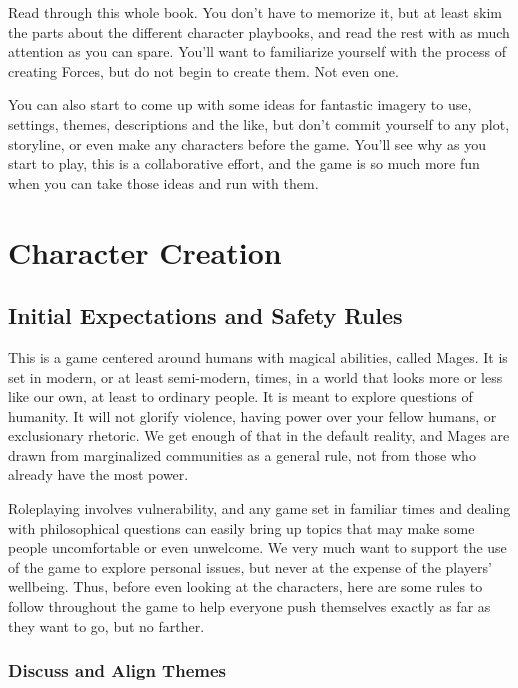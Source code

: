 \documentclass[
  oneside,
  statementpaper,
  9pt]{memoir}
\begin{document}
Read through this whole book. You don't have to memorize it, but at
least skim the parts about the different character playbooks, and read
the rest with as much attention as you can spare. You'll want to
familiarize yourself with the process of creating Forces, but do not
begin to create them. Not even one.

You can also start to come up with some ideas for fantastic imagery to
use, settings, themes, descriptions and the like, but don't commit
yourself to any plot, storyline, or even make any characters before the
game. You'll see why as you start to play, this is a collaborative
effort, and the game is so much more fun when you can take those ideas
and run with them.

\hypertarget{character-creation}{%
\section{Character Creation}\label{character-creation}}

\label{Safety Rules}

\hypertarget{initial-expectations-and-safety-rules}{%
\subsection{Initial Expectations and Safety
Rules}\label{initial-expectations-and-safety-rules}}

This is a game centered around humans with magical abilities, called
Mages. It is set in modern, or at least semi-modern, times, in a world
that looks more or less like our own, at least to ordinary people. It is
meant to explore questions of humanity. It will not glorify violence,
having power over your fellow humans, or exclusionary rhetoric. We get
enough of that in the default reality, and Mages are drawn from
marginalized communities as a general rule, not from those who already
have the most power.

Roleplaying involves vulnerability, and any game set in familiar times
and dealing with philosophical questions can easily bring up topics that
may make some people uncomfortable or even unwelcome. We very much want
to support the use of the game to explore personal issues, but never at
the expense of the players' wellbeing. Thus, before even looking at the
characters, here are some rules to follow throughout the game to help
everyone push themselves exactly as far as they want to go, but no
farther.

\hypertarget{discuss-and-align-themes}{%
\subsubsection{Discuss and Align
Themes}\label{discuss-and-align-themes}}
\end{document}
